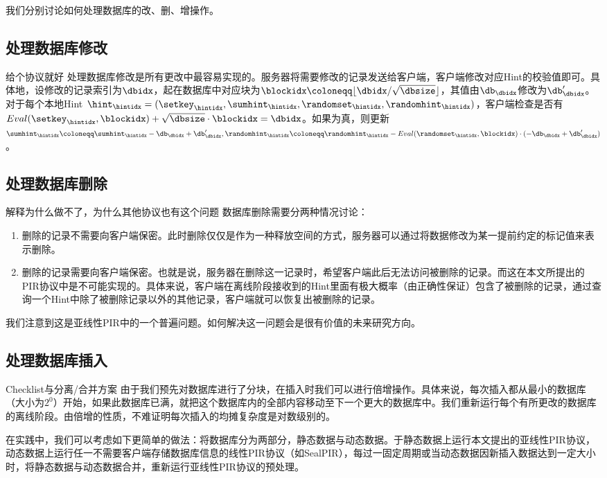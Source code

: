 我们分别讨论如何处理数据库的改、删、增操作。

\subsection{处理数据库修改}
{给个协议就好}
处理数据库修改是所有更改中最容易实现的。服务器将需要修改的记录发送给客户端，客户端修改对应Hint的校验值即可。具体地，设修改的记录索引为$\dbidx$，起在数据库中对应块为$\blockidx\coloneqq \lfloor \dbidx/\sqrt{\dbsize}\rfloor$，其值由$\db_\dbidx$修改为$\db_\dbidx'$。对于每个本地Hint $\hint_\hintidx = (\setkey_\hintidx,\sumhint_\hintidx,\randomset_\hintidx,\randomhint_\hintidx)$，客户端检查是否有 $Eval(\setkey_\hintidx, \blockidx) + \sqrt{\dbsize}\cdot \blockidx = \dbidx $。如果为真，则更新$\sumhint_\hintidx \coloneqq \sumhint_\hintidx - \db_{\dbidx} + \db_{\dbidx}', \randomhint_\hintidx \coloneqq \randomhint_\hintidx - Eval(\randomset_\hintidx,\blockidx)\cdot(-\db_{\dbidx} + \db_{\dbidx}')$。

\subsection{处理数据库删除}
{解释为什么做不了，为什么其他协议也有这个问题}
数据库删除需要分两种情况讨论：
\begin{enumerate}
    \item 删除的记录不需要向客户端保密。此时删除仅仅是作为一种释放空间的方式，服务器可以通过将数据修改为某一提前约定的标记值来表示删除。
    \item 删除的记录需要向客户端保密。也就是说，服务器在删除这一记录时，希望客户端此后无法访问被删除的记录。而这在本文所提出的PIR协议中是不可能实现的。具体来说，客户端在离线阶段接收到的Hint里面有极大概率（由正确性保证）包含了被删除的记录，通过查询一个Hint中除了被删除记录以外的其他记录，客户端就可以恢复出被删除的记录。
\end{enumerate}

我们注意到这是亚线性PIR中的一个普遍问题。如何解决这一问题会是很有价值的未来研究方向。

\subsection{处理数据库插入}
{Checklist与分离/合并方案}
由于我们预先对数据库进行了分块，在插入时我们可以进行倍增操作。具体来说，每次插入都从最小的数据库（大小为$2^0$）开始，如果此数据库已满，就把这个数据库内的全部内容移动至下一个更大的数据库中。我们重新运行每个有所更改的数据库的离线阶段。由倍增的性质，不难证明每次插入的均摊复杂度是对数级别的。

在实践中，我们可以考虑如下更简单的做法：将数据库分为两部分，静态数据与动态数据。于静态数据上运行本文提出的亚线性PIR协议，动态数据上运行任一不需要客户端存储数据库信息的线性PIR协议（如SealPIR\cite{SP:ACLS18}），每过一固定周期或当动态数据因新插入数据达到一定大小时，将静态数据与动态数据合并，重新运行亚线性PIR协议的预处理。